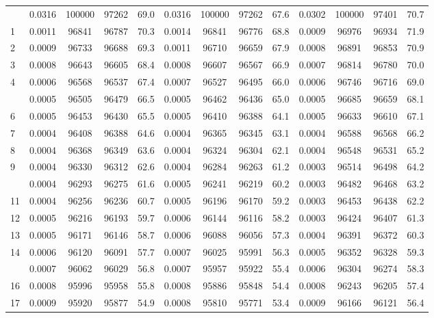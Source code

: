 \documentclass[
  14pt,
]{article}
\begin{document}
\begin{longtable}[t]{lcccccccccccc}
\endfoot
\bottomrule
\endlastfoot
0 & 0.0316 & 100000 & 97262 & 69.0 & 0.0316 & 100000 & 97262 & 67.6 & 0.0302 & 100000 & 97401 & 70.7\\
1 & 0.0011 & 96841 & 96787 & 70.3 & 0.0014 & 96841 & 96776 & 68.8 & 0.0009 & 96976 & 96934 & 71.9\\
2 & 0.0009 & 96733 & 96688 & 69.3 & 0.0011 & 96710 & 96659 & 67.9 & 0.0008 & 96891 & 96853 & 70.9\\
3 & 0.0008 & 96643 & 96605 & 68.4 & 0.0008 & 96607 & 96567 & 66.9 & 0.0007 & 96814 & 96780 & 70.0\\
4 & 0.0006 & 96568 & 96537 & 67.4 & 0.0007 & 96527 & 96495 & 66.0 & 0.0006 & 96746 & 96716 & 69.0\\
\addlinespace
5 & 0.0005 & 96505 & 96479 & 66.5 & 0.0005 & 96462 & 96436 & 65.0 & 0.0005 & 96685 & 96659 & 68.1\\
6 & 0.0005 & 96453 & 96430 & 65.5 & 0.0005 & 96410 & 96388 & 64.1 & 0.0005 & 96633 & 96610 & 67.1\\
7 & 0.0004 & 96408 & 96388 & 64.6 & 0.0004 & 96365 & 96345 & 63.1 & 0.0004 & 96588 & 96568 & 66.2\\
8 & 0.0004 & 96368 & 96349 & 63.6 & 0.0004 & 96324 & 96304 & 62.1 & 0.0004 & 96548 & 96531 & 65.2\\
9 & 0.0004 & 96330 & 96312 & 62.6 & 0.0004 & 96284 & 96263 & 61.2 & 0.0003 & 96514 & 96498 & 64.2\\
\addlinespace
10 & 0.0004 & 96293 & 96275 & 61.6 & 0.0005 & 96241 & 96219 & 60.2 & 0.0003 & 96482 & 96468 & 63.2\\
11 & 0.0004 & 96256 & 96236 & 60.7 & 0.0005 & 96196 & 96170 & 59.2 & 0.0003 & 96453 & 96438 & 62.2\\
12 & 0.0005 & 96216 & 96193 & 59.7 & 0.0006 & 96144 & 96116 & 58.2 & 0.0003 & 96424 & 96407 & 61.3\\
13 & 0.0005 & 96171 & 96146 & 58.7 & 0.0006 & 96088 & 96056 & 57.3 & 0.0004 & 96391 & 96372 & 60.3\\
14 & 0.0006 & 96120 & 96091 & 57.7 & 0.0007 & 96025 & 95991 & 56.3 & 0.0005 & 96352 & 96328 & 59.3\\
\addlinespace
15 & 0.0007 & 96062 & 96029 & 56.8 & 0.0007 & 95957 & 95922 & 55.4 & 0.0006 & 96304 & 96274 & 58.3\\
16 & 0.0008 & 95996 & 95958 & 55.8 & 0.0008 & 95886 & 95848 & 54.4 & 0.0008 & 96243 & 96205 & 57.4\\
17 & 0.0009 & 95920 & 95877 & 54.9 & 0.0008 & 95810 & 95771 & 53.4 & 0.0009 & 96166 & 96121 & 56.4\\

\end{longtable}
\end{document}
